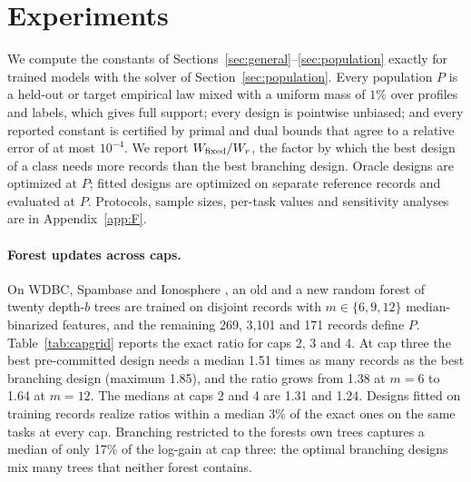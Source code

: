 \section{Experiments}\label{sec:experiments}
We compute the constants of Sections~\ref{sec:general}--\ref{sec:population} exactly for trained models with the solver of Section~\ref{sec:population}. Every population $P$ is a held-out or target empirical law mixed with a uniform mass of $1\%$ over profiles and labels, which gives full support; every design is pointwise unbiased; and every reported constant is certified by primal and dual bounds that agree to a relative error of at most $10^{-4}$. We report $W_{\rm fixed}/W_r$, the factor by which the best design of a class needs more records than the best branching design. Oracle designs are optimized at $P$; fitted designs are optimized on separate reference records and evaluated at $P$. Protocols, sample sizes, per-task values and sensitivity analyses are in Appendix~\ref{app:F}.

\paragraph{Forest updates across caps.}
On WDBC, Spambase and Ionosphere \citep{wolberg1993,spambase1999,ionosphere1989}, an old and a new random forest of twenty depth-$b$ trees are trained on disjoint records with $m\in\{6,9,12\}$ median-binarized features, and the remaining 269, 3,101 and 171 records define $P$. Table~\ref{tab:capgrid} reports the exact ratio for caps 2, 3 and 4. At cap three the best pre-committed design needs a median 1.51 times as many records as the best branching design (maximum 1.85), and the ratio grows from 1.38 at $m=6$ to 1.64 at $m=12$. The medians at caps 2 and 4 are 1.31 and 1.24. Designs fitted on training records realize ratios within a median 3\% of the exact ones on the same tasks at every cap. Branching restricted to the forests\textquotesingle{} own trees captures a median of only 17\% of the log-gain at cap three: the optimal branching designs mix many trees that neither forest contains.



